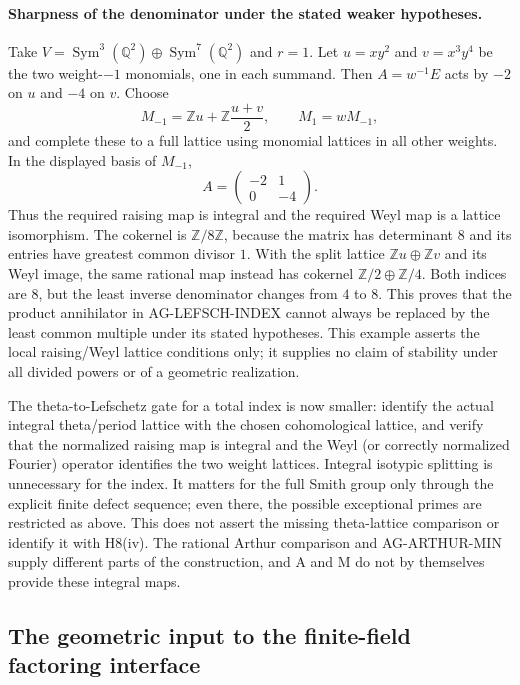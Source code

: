 \documentclass[11pt,a4paper]{article}
\begin{document}
\paragraph{Sharpness of the denominator under the stated weaker hypotheses.}
Take $V=\operatorname{Sym}^3(\mathbb Q^2)\oplus
\operatorname{Sym}^7(\mathbb Q^2)$ and $r=1$.
Let $u=xy^2$ and $v=x^3y^4$ be the two weight-$-1$ monomials,
one in each summand. Then $A=w^{-1}E$ acts by $-2$ on $u$
and $-4$ on $v$. Choose
\[
 M_{-1}=\mathbb Zu+\mathbb Z\frac{u+v}{2},\qquad
 M_1=wM_{-1},
\]
and complete these to a full lattice using monomial lattices
in all other weights. In the displayed basis of $M_{-1}$,
\[
 A=\begin{pmatrix}-2&1\\0&-4\end{pmatrix}.
\]
Thus the required raising map is integral and the required
Weyl map is a lattice isomorphism. The cokernel is
$\mathbb Z/8\mathbb Z$, because the matrix has determinant
$8$ and its entries have greatest common divisor $1$.
With the split lattice $\mathbb Zu\oplus\mathbb Zv$ and its
Weyl image, the same rational map instead has cokernel
$\mathbb Z/2\oplus\mathbb Z/4$. Both indices are $8$,
but the least inverse denominator changes from $4$ to $8$.
This proves that the product annihilator in AG-LEFSCH-INDEX
cannot always be replaced by the least common multiple under
its stated hypotheses. This example asserts the local
raising/Weyl lattice conditions only; it supplies no claim
of stability under all divided powers or of a geometric
realization.

The theta-to-Lefschetz gate for a total index is now smaller:
identify the actual integral theta/period lattice with the
chosen cohomological lattice, and verify that the normalized
raising map is integral and the Weyl (or correctly normalized
Fourier) operator identifies the two weight lattices.
Integral isotypic splitting is unnecessary for the index.
It matters for the full Smith group only through the explicit
finite defect sequence; even there, the possible exceptional
primes are restricted as above. This does not assert the
missing theta-lattice comparison or identify it with H8(iv).
The rational Arthur comparison and AG-ARTHUR-MIN supply
different parts of the construction, and A and M do not by
themselves provide these integral maps.

\subsection{The geometric input to the finite-field factoring interface}
\end{document}
